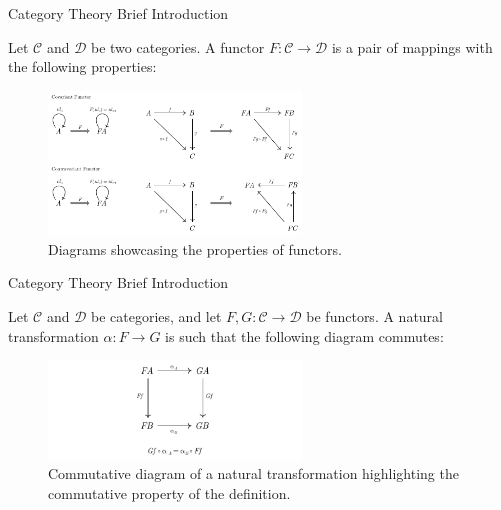 \documentclass[aspectratio=169,xcolor=dvipsnames,10pt]{beamer}
\begin{document}
\begin{frame}[fragile]{Category Theory Brief Introduction}
	\begin{definition}[Functor]
		Let $\mathcal C$ and $\mathcal D$ be two categories. A functor $F: \mathcal C \to \mathcal D$ is
		a pair of mappings with the following properties:
		\begin{figure}[H]
			\begin{center}
				\includegraphics[width=0.6\textwidth]{./figs/Functor.pdf}
			\end{center}
			\caption{Diagrams showcasing the properties of functors.}
			\label{fig:Functor}
		\end{figure}
	\end{definition}

\end{frame}

\begin{frame}[fragile]{Category Theory Brief Introduction}
	\begin{definition}
		Let $\mathcal C$ and $\mathcal D$ be categories, and let $F,G:\mathcal C \to \mathcal D$ be functors.
		A natural transformation $\alpha: F \to G$ is such that the following diagram commutes:
		\begin{figure}[H]
			\begin{center}
				\includegraphics[width=0.60\textwidth]{./figs/NaturalTransformation.pdf}
			\end{center}
			\caption{Commutative diagram of a natural transformation highlighting the commutative property of the definition.}
			\label{fig:NaturalTransformation}
		\end{figure}
	\end{definition}
\end{frame}
\end{document}
